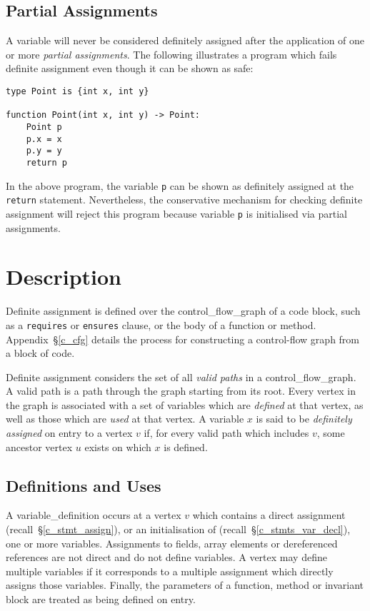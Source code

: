 \subsection{Partial Assignments}

A variable will never be considered definitely assigned after the application of one or more {\em partial assignments}.  The following illustrates a program which fails definite assignment even though it can be shown as safe:

\begin{lstlisting}
type Point is {int x, int y}

function Point(int x, int y) -> Point:
    Point p
    p.x = x
    p.y = y
    return p
\end{lstlisting}

In the above program, the variable \lstinline{p} can be shown as definitely assigned at the \lstinline{return} statement.  Nevertheless, the conservative mechanism for checking definite assignment will reject this program because variable \lstinline{p} is initialised via partial assignments.  

\section{Description}

Definite assignment is defined over the \gls{control_flow_graph} of a code block, such as a \lstinline{requires} or \lstinline{ensures} clause, or the body of a function or method.  Appendix~\S\ref{c_cfg} details the process for constructing a control-flow graph from a block of code.  

Definite assignment considers the set of all {\em valid paths} in a \gls{control_flow_graph}.  A valid path is a path through the graph starting from its root.  Every vertex in the graph is associated with a set of variables which are {\em defined} at that vertex, as well as those which are {\em used} at that vertex.  A variable $x$ is said to be {\em definitely assigned} on entry to a vertex $v$ if, for every valid path which includes $v$, some ancestor vertex $u$ exists on which $x$ is defined.

\subsection{Definitions and Uses}

A \gls{variable_definition} occurs at a vertex $v$ which contains a direct assignment (recall~\S\ref{c_stmt_assign}), or an initialisation of (recall~\S\ref{c_stmts_var_decl}), one or more variables.  Assignments to fields, array elements or dereferenced references are not direct and do not define variables.  A vertex may define multiple variables if it corresponds to a multiple assignment which directly assigns those variables.  Finally, the parameters of a function, method or invariant block are treated as being defined on entry. 

